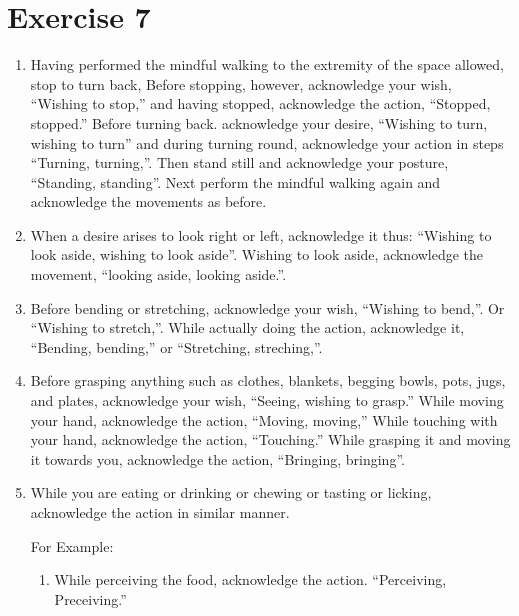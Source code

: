 \documentclass[a5paper,10pt,english]{book}
\begin{document}
\section{Exercise 7}
\label{\detokenize{practice:exercise-7}}\begin{enumerate}
%
\item {} 
\sphinxAtStartPar
Having performed the mindful walking to the extremity of the space allowed, stop to turn back, Before stopping, however, acknowledge your wish, “Wishing to stop,” and having stopped, acknowledge the action, “Stopped, stopped.” Before turning back. acknowledge your desire, “Wishing to turn, wishing to turn” and during turning round, acknowledge your action in steps “Turning, turning,”. Then stand still and acknowledge your posture, “Standing, standing”. Next perform the mindful walking again and acknowledge the movements as before.

\item {} 
\sphinxAtStartPar
When a desire arises to look right or left, acknowledge it thus: “Wishing to look aside, wishing to look aside”. Wishing to look aside, acknowledge the movement, “looking aside, looking aside.”.

\item {} 
\sphinxAtStartPar
Before bending or stretching, acknowledge your wish, “Wishing to bend,”. Or “Wishing to stretch,”. While actually doing the action, acknowledge it, “Bending, bending,” or “Stretching, streching,”.

\item {} 
\sphinxAtStartPar
Before grasping anything such as clothes, blankets, begging bowls, pots, jugs, and plates, acknowledge your wish, “Seeing, wishing to grasp.” While moving your hand, acknowledge the action, “Moving, moving,” While touching with your hand, acknowledge the action, “Touching.” While grasping it and moving it towards you, acknowledge the action, “Bringing, bringing”.

\item {} 
\sphinxAtStartPar
While you are eating or drinking or chewing or tasting or licking, acknowledge the action in similar manner.

\sphinxAtStartPar
For Example:
\begin{enumerate}
%
\item {} 
\sphinxAtStartPar
While perceiving the food, acknowledge the action. “Perceiving, Preceiving.”


\end{enumerate}
\end{enumerate}
\end{document}
